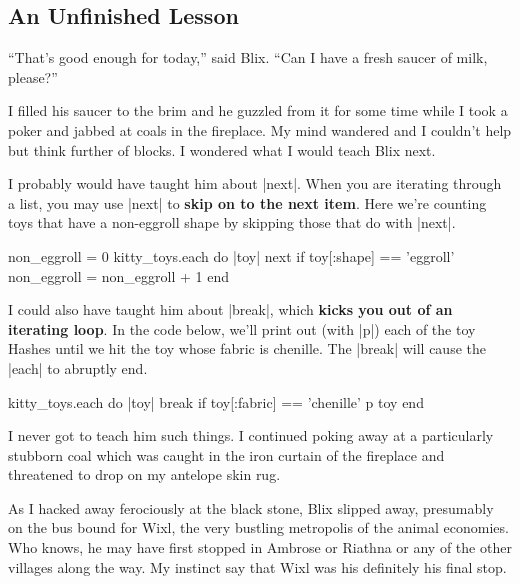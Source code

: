 \documentclass[12pt,twoside]{report}
\begin{document}
\subsection{ An Unfinished Lesson}



``That's good enough for today,'' said Blix.  ``Can I have a fresh
saucer of milk, please?''

I filled his saucer to the brim and he guzzled from it for some time
while I took a poker and jabbed at coals in the fireplace.  My mind
wandered and I couldn't help but think further of blocks.  I wondered
what I would teach Blix next.

I probably would have taught him about
\rubyinline|next|.  When you are iterating through a
list, you may use \rubyinline|next| to {\bf skip on to
  the next item}.  Here we're counting toys that have a non-eggroll
shape by skipping those that do with
\rubyinline|next|.


\begin{rubycode}

 non_eggroll = 0
 kitty_toys.each do |toy|
   next if toy[:shape] == 'eggroll'
   non_eggroll = non_eggroll + 1
 end

\end{rubycode}

I could also have taught him about \rubyinline|break|,
which {\bf kicks you out of an iterating loop}. In the code below,
we'll print out (with \rubyinline|p|) each of the toy
Hashes until we hit the toy whose fabric is chenille.  The
\rubyinline|break| will cause the
\rubyinline|each| to abruptly end.


\begin{rubycode}

 kitty_toys.each do |toy|
   break if toy[:fabric] == 'chenille'
   p toy
 end

\end{rubycode}

I never got to teach him such things.  I continued poking away at a
particularly stubborn coal which was caught in the iron curtain of the
fireplace and threatened to drop on my antelope skin rug.

As I hacked away ferociously at the black stone, Blix slipped away,
presumably on the bus bound for Wixl, the very bustling metropolis of
the animal economies.  Who knows, he may have first stopped in Ambrose
or Riathna or any of the other villages along the way.  My instinct
say that Wixl was his definitely his final stop.
\end{document}
